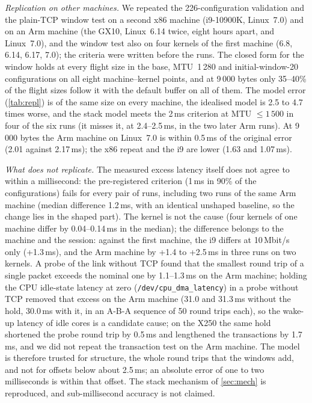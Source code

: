 \documentclass[preprint,12pt]{elsarticle}
\newcommand{\ms}{\,ms\xspace}
\newcommand{\Mbits}{\,Mbit/s\xspace}
\begin{document}
\emph{Replication on other machines.}\label{sec:repl} We repeated the 226-configuration validation and the plain-TCP window test on a second x86 machine (i9-10900K, Linux~7.0) and on an Arm machine (the GX10, Linux~6.14 twice, eight hours apart, and Linux~7.0), and the window test also on four kernels of the first machine (6.8, 6.14, 6.17, 7.0); the criteria were written before the runs. The closed form for the window holds at every flight size in the base, MTU~1\,280 and initial-window-20 configurations on all eight machine--kernel points, and at 9\,000 bytes only 35--40\% of the flight sizes follow it with the default buffer on all of them. The model error (\cref{tab:repl}) is of the same size on every machine, the idealised model is 2.5 to 4.7 times worse, and the stack model meets the 2\ms criterion at MTU $\le 1\,500$ in four of the six runs (it misses it, at 2.4--2.5\ms, in the two later Arm runs). At 9\,000 bytes the Arm machine on Linux~7.0 is within 0.5\ms of the original error (2.01 against 2.17\ms); the x86 repeat and the i9 are lower (1.63 and 1.07\ms).

\emph{What does not replicate.} The measured excess latency itself does not agree to within a millisecond: the pre-registered criterion (1\ms in 90\% of the configurations) fails for every pair of runs, including two runs of the same Arm machine (median difference 1.2\ms, with an identical unshaped baseline, so the change lies in the shaped part). The kernel is not the cause (four kernels of one machine differ by 0.04--0.14\ms in the median); the difference belongs to the machine and the session: against the first machine, the i9 differs at 10\Mbits only (+1.3\ms), and the Arm machine by +1.4 to +2.5\ms in three runs on two kernels. A probe of the link without TCP found that the smallest round trip of a single packet exceeds the nominal one by 1.1--1.3\ms on the Arm machine; holding the CPU idle-state latency at zero (\texttt{/dev/cpu\_dma\_latency}) in a probe without TCP removed that excess on the Arm machine (31.0 and 31.3\ms without the hold, 30.0\ms with it, in an A-B-A sequence of 50 round trips each), so the wake-up latency of idle cores is a candidate cause; on the X250 the same hold shortened the probe round trip by 0.5\ms and lengthened the transactions by 1.7\ms, and we did not repeat the transaction test on the Arm machine. The model is therefore trusted for structure, the whole round trips that the windows add, and not for offsets below about 2.5\ms; an absolute error of one to two milliseconds is within that offset. The stack mechanism of \cref{sec:mech} is reproduced, and sub-millisecond accuracy is not claimed.
\end{document}
